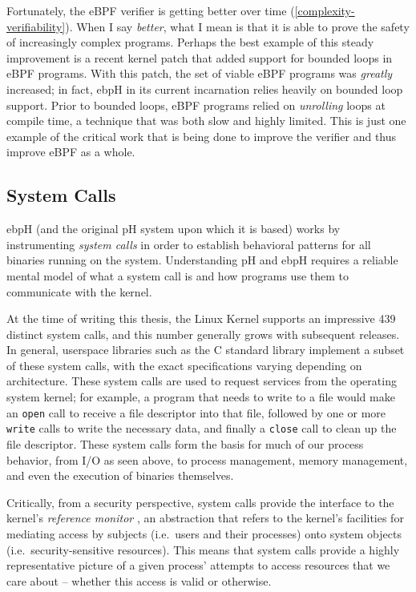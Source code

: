 \documentclass[
  12pt]{findlay}
\newcommand{\passthrough}[1]{#1}
\begin{document}
Fortunately, the eBPF verifier is getting better over time
(\autoref{complexity-verifiability}). When I say \emph{better}, what I
mean is that it is able to prove the safety of increasingly complex
programs. Perhaps the best example of this steady improvement is a
recent kernel patch \autocite{starovoitov19} that added support for
bounded loops in eBPF programs. With this patch, the set of viable eBPF
programs was \emph{greatly} increased; in fact, ebpH in its current
incarnation relies heavily on bounded loop support. Prior to bounded
loops, eBPF programs relied on \emph{unrolling} loops at compile time, a
technique that was both slow and highly limited. This is just one
example of the critical work that is being done to improve the verifier
and thus improve eBPF as a whole.

\hypertarget{system-calls}{%
\subsection{System Calls}\label{system-calls}}

ebpH (and the original pH system upon which it is based) works by
instrumenting \emph{system calls} in order to establish behavioral
patterns for all binaries running on the system. Understanding pH and
ebpH requires a reliable mental model of what a system call is and how
programs use them to communicate with the kernel.

At the time of writing this thesis, the Linux Kernel \autocite{unistd}
supports an impressive 439 distinct system calls, and this number
generally grows with subsequent releases. In general, userspace
libraries such as the C standard library implement a subset of these
system calls, with the exact specifications varying depending on
architecture. These system calls are used to request services from the
operating system kernel; for example, a program that needs to write to a
file would make an \passthrough{\lstinline!open!} call to receive a file
descriptor into that file, followed by one or more
\passthrough{\lstinline!write!} calls to write the necessary data, and
finally a \passthrough{\lstinline!close!} call to clean up the file
descriptor. These system calls form the basis for much of our process
behavior, from I/O as seen above, to process management, memory
management, and even the execution of binaries themselves.

Critically, from a security perspective, system calls provide the
interface to the kernel's \emph{reference monitor}
\autocite{jaeger08,vanoorschot19,anderson72}, an abstraction that refers
to the kernel's facilities for mediating access by subjects (i.e.~users
and their processes) onto system objects (i.e.~security-sensitive
resources). This means that system calls provide a highly representative
picture of a given process' attempts to access resources that we care
about -- whether this access is valid or otherwise.
\end{document}
